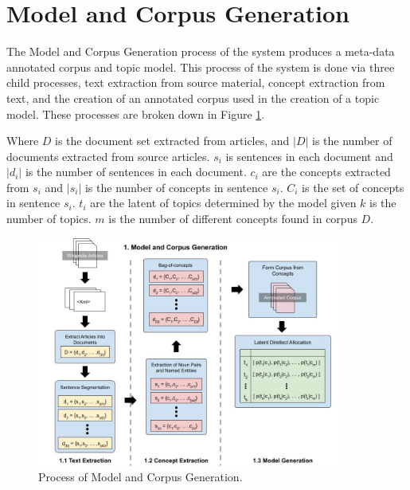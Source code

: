 \section{Model and Corpus Generation}
The Model and Corpus Generation process of the system produces a meta-data annotated corpus and topic model. This process of the system is done via three child processes, text extraction from source material, concept extraction from text, and the creation of an annotated corpus used in the creation of a topic model. These processes are broken down in Figure \ref{modelDesign}.

Where $D$ is the document set extracted from articles, and $|D|$ is the number of documents extracted from source articles. $s_i$ is sentences in each document and $|d_i|$ is the number of sentences in each document. $c_i$ are the concepts extracted from $s_i$ and $|s_i|$ is the number of concepts in sentence $s_i$. $C_i$ is the set of concepts in sentence $s_i$. $t_i$ are the latent of topics determined by the model given $k$ is the number of topics. $m$ is the number of different concepts found in corpus $D$.

\begin{figure}[H]
    \centering
         \includegraphics[width=0.90\textwidth]{Figures/System_Design_Model_Gen.jpg}
          \caption{Process of Model and Corpus Generation.}
           \label{modelDesign}
\end{figure}


